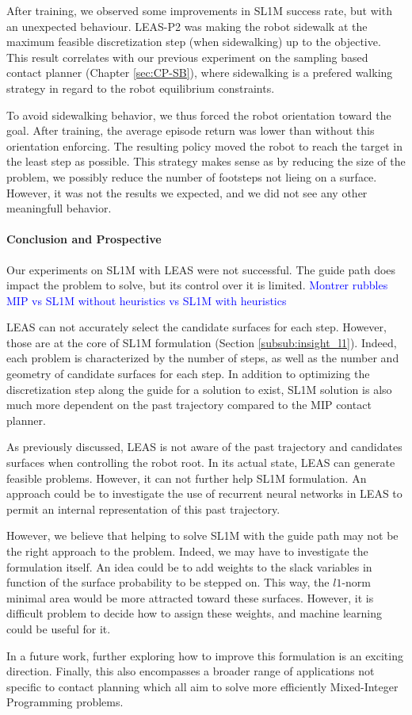 After training, we observed some improvements in SL1M success rate, but with an unexpected behaviour.
LEAS-P2 was making the robot sidewalk at the maximum feasible discretization step (when sidewalking) up to the objective.
This result correlates with our previous experiment on the sampling based contact planner (Chapter \ref{sec:CP-SB}), where sidewalking is a prefered walking strategy in regard to the robot equilibrium constraints.

To avoid sidewalking behavior, we thus forced the robot orientation toward the goal.
After training, the average episode return was lower than without this orientation enforcing.
The resulting policy moved the robot to reach the target in the least step as possible.
This strategy makes sense as by reducing the size of the problem, we possibly reduce the number of footsteps not lieing on a surface.
However, it was not the results we expected, and we did not see any other meaningfull behavior.

\paragraph{Conclusion and Prospective}

Our experiments on SL1M with LEAS were not successful.
The guide path does impact the problem to solve, but its control over it is limited.
\textcolor{blue}{Montrer rubbles MIP vs SL1M without heuristics vs SL1M with heuristics}

LEAS can not accurately select the candidate surfaces for each step. However, those are at the core of SL1M formulation (Section \ref{subsub:insight_l1}). 
Indeed, each problem is characterized by the number of steps, as well as the number and geometry of candidate surfaces for each step.
In addition to optimizing the discretization step along the guide for a solution to exist, SL1M solution is also much more dependent on the past trajectory compared to the MIP contact planner.

As previously discussed, LEAS is not aware of the past trajectory and candidates surfaces when controlling the robot root. 
In its actual state, LEAS can generate feasible problems. However, it can not further help SL1M formulation.
An approach could be to investigate the use of recurrent neural networks in LEAS to permit an internal representation of this past trajectory.

However, we believe that helping to solve SL1M with the guide path may not be the right approach to the problem.
Indeed, we may have to investigate the formulation itself.
An idea could be to add weights to the slack variables in function of the surface probability to be stepped on.
This way, the $l1$-norm minimal area would be more attracted toward these surfaces. 
However, it is difficult problem to decide how to assign these weights, and machine learning could be useful for it.

In a future work, further exploring how to improve this formulation is an exciting direction. 
Finally, this also encompasses a broader range of applications not specific to contact planning which all aim to solve more efficiently Mixed-Integer Programming problems.